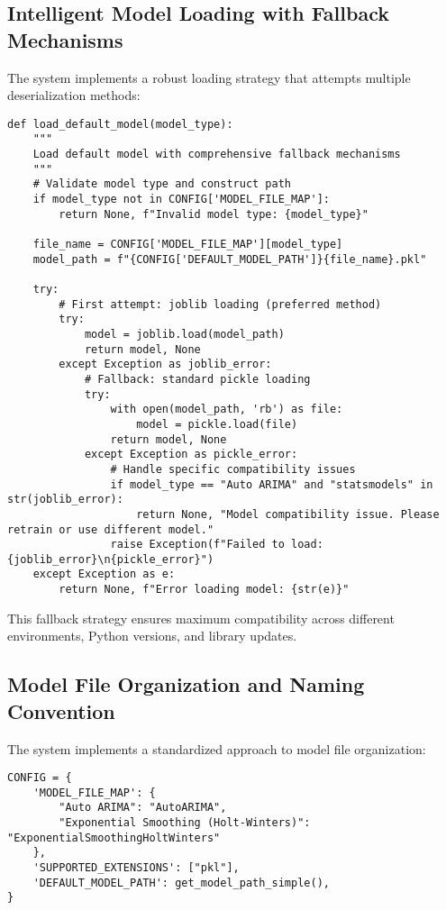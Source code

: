 \subsection{Intelligent Model Loading with Fallback Mechanisms}

The system implements a robust loading strategy that attempts multiple deserialization methods:

\begin{lstlisting}[language=MyPython, caption={Robust Model Loading with Multiple Fallback Methods}]
def load_default_model(model_type):
    """
    Load default model with comprehensive fallback mechanisms
    """
    # Validate model type and construct path
    if model_type not in CONFIG['MODEL_FILE_MAP']:
        return None, f"Invalid model type: {model_type}"
    
    file_name = CONFIG['MODEL_FILE_MAP'][model_type]
    model_path = f"{CONFIG['DEFAULT_MODEL_PATH']}{file_name}.pkl"
    
    try:
        # First attempt: joblib loading (preferred method)
        try:
            model = joblib.load(model_path)
            return model, None
        except Exception as joblib_error:
            # Fallback: standard pickle loading
            try:
                with open(model_path, 'rb') as file:
                    model = pickle.load(file)
                return model, None
            except Exception as pickle_error:
                # Handle specific compatibility issues
                if model_type == "Auto ARIMA" and "statsmodels" in str(joblib_error):
                    return None, "Model compatibility issue. Please retrain or use different model."
                raise Exception(f"Failed to load: {joblib_error}\n{pickle_error}")
    except Exception as e:
        return None, f"Error loading model: {str(e)}"
\end{lstlisting}

This fallback strategy ensures maximum compatibility across different environments, Python versions, and library updates.

\subsection{Model File Organization and Naming Convention}

The system implements a standardized approach to model file organization:

\begin{lstlisting}[language=MyPython, caption={Model File Mapping Configuration}]
CONFIG = {
    'MODEL_FILE_MAP': {
        "Auto ARIMA": "AutoARIMA",
        "Exponential Smoothing (Holt-Winters)": "ExponentialSmoothingHoltWinters"
    },
    'SUPPORTED_EXTENSIONS': ["pkl"],
    'DEFAULT_MODEL_PATH': get_model_path_simple(),
}
\end{lstlisting}

